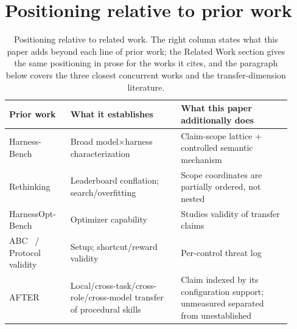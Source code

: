 \documentclass{article}
\begin{document}
\section{Positioning relative to prior work}
\label{app:novelty}
\begin{table}[h]
\centering\small
\setlength{\tabcolsep}{4pt}
\caption{Positioning relative to related work. The right column states what this paper adds beyond each line of prior work; the Related Work section gives the same positioning in prose for the works it cites, and the paragraph below covers the three closest concurrent works and the transfer-dimension literature.}
\label{tab:novelty}
\begin{tabular}{p{0.20\linewidth} p{0.36\linewidth} p{0.36\linewidth}}
\toprule
Prior work & What it establishes & What this paper additionally does \\
\midrule
Harness-Bench~\citep{harnessbench} & Broad model$\times$harness characterization & Claim-scope lattice + controlled semantic mechanism \\
Rethinking~\citep{harnesseval} & Leaderboard conflation; search/overfitting & Scope coordinates are partially ordered, not nested \\
HarnessOpt-Bench~\citep{harnesso} & Optimizer capability & Studies validity of transfer claims \\
ABC~\citep{abc} / Protocol validity~\citep{protocolval} & Setup; shortcut/reward validity & Per-control threat log \\
AFTER~\citep{after} & Local/cross-task/cross-role/cross-model transfer of procedural skills & Claim indexed by its configuration support; unmeasured separated from unestablished \\
\bottomrule
\end{tabular}
\end{table}
\end{document}
